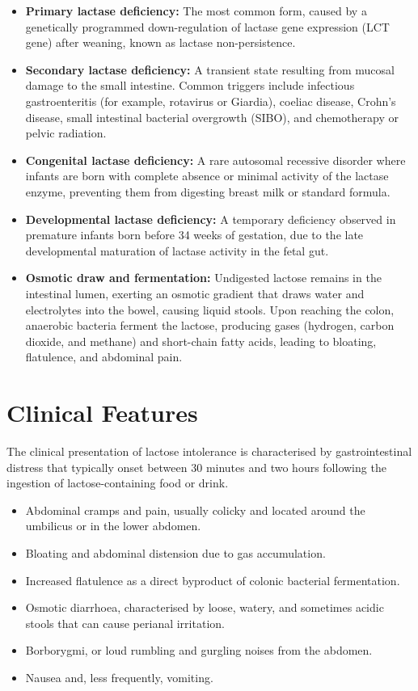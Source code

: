 \begin{itemize}
    \item \textbf{Primary lactase deficiency:} The most common form, caused by a genetically programmed down-regulation of lactase gene expression (LCT gene) after weaning, known as lactase non-persistence.
    \item \textbf{Secondary lactase deficiency:} A transient state resulting from mucosal damage to the small intestine. Common triggers include infectious gastroenteritis (for example, rotavirus or Giardia), coeliac disease, Crohn's disease, small intestinal bacterial overgrowth (SIBO), and chemotherapy or pelvic radiation.
    \item \textbf{Congenital lactase deficiency:} A rare autosomal recessive disorder where infants are born with complete absence or minimal activity of the lactase enzyme, preventing them from digesting breast milk or standard formula.
    \item \textbf{Developmental lactase deficiency:} A temporary deficiency observed in premature infants born before 34 weeks of gestation, due to the late developmental maturation of lactase activity in the fetal gut.
    \item \textbf{Osmotic draw and fermentation:} Undigested lactose remains in the intestinal lumen, exerting an osmotic gradient that draws water and electrolytes into the bowel, causing liquid stools. Upon reaching the colon, anaerobic bacteria ferment the lactose, producing gases (hydrogen, carbon dioxide, and methane) and short-chain fatty acids, leading to bloating, flatulence, and abdominal pain.
\end{itemize}

\section*{Clinical Features}
The clinical presentation of lactose intolerance is characterised by gastrointestinal distress that typically onset between 30 minutes and two hours following the ingestion of lactose-containing food or drink.

\begin{itemize}
    \item Abdominal cramps and pain, usually colicky and located around the umbilicus or in the lower abdomen.
    \item Bloating and abdominal distension due to gas accumulation.
    \item Increased flatulence as a direct byproduct of colonic bacterial fermentation.
    \item Osmotic diarrhoea, characterised by loose, watery, and sometimes acidic stools that can cause perianal irritation.
    \item Borborygmi, or loud rumbling and gurgling noises from the abdomen.
    \item Nausea and, less frequently, vomiting.
\end{itemize}

